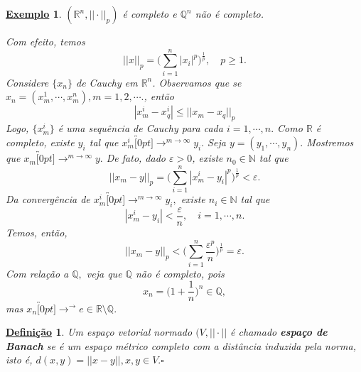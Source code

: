 \documentclass{article}
\newtheorem*{def*}{\underline{Defini\c c\~ao}}
\newtheorem{example}{\underline{Exemplo}}
\begin{document}
\begin{example}
  \((\mathbb{R}^{n}, ||\cdot||_{p})\) é completo e \(\mathbb{Q}^{n}\) não é completo.

  Com efeito, temos 
  \[
    ||x||_{p} = \biggl(\sum\limits_{i=1}^{n}|x_{i}|^{p}\biggr)^{\frac{1}{p}},\quad p\geq 1.
  \]
Considere \(\{x_{n}\}\) de Cauchy em \(\mathbb{R}^{n}\). Observamos que se \(x_{n} = (x_{m}^{1}, \cdots, x_{m}^{n}), m = 1, 2, \cdots.\), então 
  \[
    |x_{m}^{i}-x_{q}^{i}|\leq ||x_{m}-x_{q}||_{p}
  \]
Logo, \(\{x_{m}^{i}\}\) é uma sequência de Cauchy para cada \(i=1, \cdots, n.\) Como \(\mathbb{R}\) é completo,
existe \(y_{i}\) tal que \(x_{m}^{i}\overbracket[0pt]{\longrightarrow}^{m\to \infty}y_{i}.\) Seja \(y= (y_{1}, \cdots, y_{n}).\)
Mostremos que \(x_{m}\overbracket[0pt]{\longrightarrow}^{m\to \infty}y.\) De fato, dado \(\varepsilon >0\), existe \(n_{0}\in \mathbb{N}\)
tal que 
  \[
    ||x_{m}-y||_{p} = \biggl(\sum\limits_{i=1}^{n}|x_{m}^{i}-y_{i}|^{p}\biggr)^{\frac{1}{p}} < \varepsilon.
  \]
Da convergência de \(x_{m}^{i}\overbracket[0pt]{\longrightarrow}^{m\to \infty}y_{i},\) existe \(n_{i}\in \mathbb{N}\) tal que 
  \[
    |x_{m}^{i}-y_{i}| < \frac{\varepsilon}{n},\quad i=1,\cdots,n.
  \]
  Temos, então, 
  \[
    ||x_{m}-y||_{p} < \biggl(\sum\limits_{i=1}^{n}\frac{\varepsilon^{p}}{n}\biggr)^{\frac{1}{p}} = \varepsilon.
  \]
  Com relação a \(\mathbb{Q},\) veja que \(\mathbb{Q}\) não é completo, pois 
  \[
    x_{n} = \biggl(1 + \frac{1}{n}\biggr)^{n}\in \mathbb{Q},
  \]
  mas \(x_{n}\overbracket[0pt]{\longrightarrow}^{\to }e\in \mathbb{R}\setminus{\mathbb{Q}}.\) 

\end{example}
\begin{def*}
  Um espaço vetorial normado \((V, ||\cdot ||\) é chamado \textbf{espaço de Banach} se é um espaço métrico completo com a distância induzida pela norma, isto é,
 \(d(x, y) = ||x-y||, x, y\in V.\square\)
\end{def*}
\end{document}
